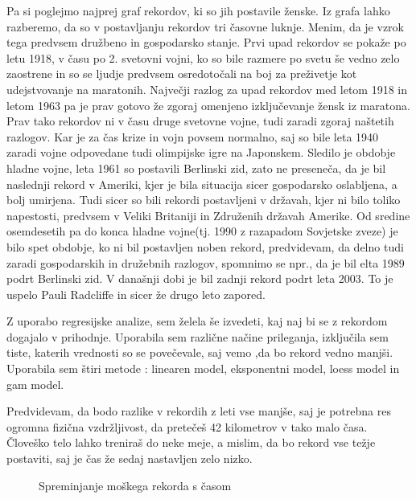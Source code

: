 \documentclass[11pt,a4paper]{article}
\begin{document}
Pa si poglejmo najprej graf rekordov, ki so jih postavile ženske.
Iz grafa lahko razberemo, da so v postavljanju rekordov tri časovne luknje. Menim, da je vzrok tega predvsem družbeno in gospodarsko stanje. Prvi upad rekordov se pokaže po letu 1918, v času po 2. svetovni vojni, ko so bile razmere po svetu še vedno zelo zaostrene in so se ljudje predvsem osredotočali na boj za preživetje kot udejstvovanje na maratonih.
Največji razlog za upad rekordov med letom 1918 in letom 1963 pa je prav gotovo že zgoraj omenjeno izključevanje žensk iz maratona.
Prav tako rekordov ni v času druge svetovne vojne, tudi zaradi zgoraj naštetih razlogov. Kar je za čas krize in vojn povsem normalno, saj so bile leta 1940 zaradi vojne odpovedane tudi olimpijske igre na Japonskem.
Sledilo je obdobje hladne vojne, leta 1961 so postavili Berlinski zid, zato ne preseneča, da je bil naslednji rekord v Ameriki, kjer je bila situacija sicer gospodarsko oslabljena, a bolj umirjena. Tudi sicer so bili rekordi postavljeni v državah, kjer ni bilo toliko napestosti, predvsem v Veliki Britaniji in Združenih državah Amerike.
Od sredine osemdesetih pa do konca hladne vojne(tj. 1990 z razapadom Sovjetske zveze) je bilo spet obdobje, ko ni bil postavljen noben rekord, predvidevam, da delno tudi zaradi gospodarskih in družebnih razlogov, spomnimo se npr., da je bil elta 1989 podrt Berlinski zid.
V današnji dobi je bil zadnji rekord podrt leta 2003. To je uspelo Pauli Radcliffe in sicer že drugo leto zapored.

Z uporabo regresijske analize, sem želela še izvedeti, kaj naj bi se z rekordom dogajalo v prihodnje. Uporabila sem različne načine prileganja, izključila sem tiste, katerih vrednosti so se povečevale, saj vemo ,da bo rekord vedno manjši.
Uporabila sem štiri metode : linearen model, eksponentni model, loess model in gam model.


Predvidevam, da bodo razlike v rekordih z leti vse manjše, saj je potrebna res ogromna fizična vzdržljivost, da  pretečeš 42 kilometrov v tako malo časa. Človeško telo lahko treniraš do neke meje, a mislim, da bo rekord vse težje postaviti, saj je čas že sedaj nastavljen zelo nizko.

\begin{figure}[H]
  \caption{Spreminjanje moškega rekorda s časom}
  \label{fig:Slika 4}
\end{figure}
\end{document}
